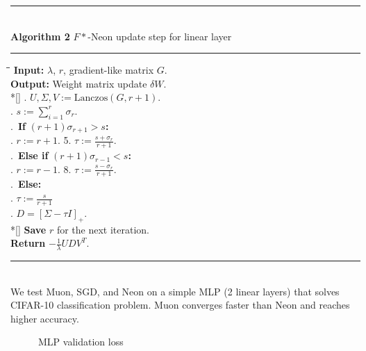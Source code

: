 \documentclass[a0]{a0poster}
\def\Head#1{\noindent{\LARGE\color{bluegray} #1}\bigskip}
\begin{document}
\begin{textblock}{7.0}
{\footnotesize{}
\noindent\rule[-5pt]{.8\textwidth}{0.4pt}\\
{\bf Algorithm 2} $F*$-Neon update step for linear layer\\
\noindent\rule[5pt]{.8\textwidth}{0.4pt}
\vspace{-15pt}
\noindent\begin{tabbing}
    \qquad\=\qquad\=\qquad\=\kill %
    {\bf Input:} $\lambda$, $r$, gradient-like matrix $G$. \\
    {\bf Output:} Weight matrix update $\delta W$.\\*[\smallskipamount]
    . $U, \Sigma, V := \textrm{Lanczos}(G, r + 1)$. \\
    . $s := \sum_{i=1}^{r}\sigma_r$. \\
    .\ {\bf If} $(r + 1)\sigma_{r + 1} > s${\bf:}\\
    \>. $r := r + 1$. 5. $\tau := \frac{s + \sigma_{r}}{r + 1}$.\\
    .\ {\bf Else if} $(r + 1)\sigma_{r - 1} < s${\bf:}\\
    \>. $r := r - 1$. 8. $\tau := \frac{s - \sigma_{r}}{r + 1}$.\\
    .\ {\bf Else:}\\
    \>. $\tau := \frac{s}{r + 1}$\\
    . $D = [\Sigma - \tau I]_+$. \\*[\smallskipamount]
    {\bf Save} $r$ for the next iteration.\\
    {\bf Return} $-\frac{1}{\lambda}U D V^T$.
\end{tabbing}
\vspace{10pt}
}

\hrule\medskip
\Head{MLP tests}\\
We test Muon, SGD, and Neon on a simple MLP (2 linear layers) that solves CIFAR-10 classification problem. Muon converges faster than Neon and reaches higher accuracy.
\begin{figure}[h]
    \caption{MLP validation loss}
    \label{fig:mlp_loss}
\end{figure} 


\end{textblock}
\end{document}
